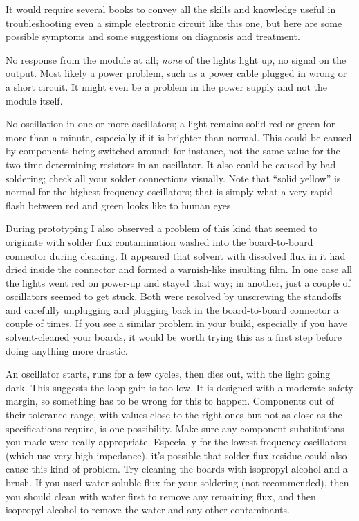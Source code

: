 It would require several books to convey all the skills and knowledge useful
in troubleshooting even a simple electronic circuit like this one, but here
are some possible symptoms and some suggestions on diagnosis and treatment.

No response from the module at all; \emph{none} of the lights light up, no
signal on the output.  Most likely a power problem, such as a power cable
plugged in wrong or a short circuit.  It might even be a problem in the
power supply and not the module itself.

No oscillation in one or more oscillators; a light remains solid red or
green for more than a minute, especially if it is brighter than normal.
This could be caused by components being switched around; for instance, not
the same value for the two time-determining resistors in an oscillator.  It
also could be caused by bad soldering; check all your solder connections
visually.  Note that ``solid yellow'' is normal for the
highest-frequency oscillators; that is simply what a very rapid flash between
red and green looks like to human eyes.

During prototyping I also observed a problem of this kind that seemed to
originate with solder flux contamination washed into the board-to-board
connector during cleaning.  It appeared that solvent with dissolved flux in
it had dried inside the connector and formed a varnish-like insulting film. 
In one case all the lights went red on power-up and stayed that way; in
another, just a couple of oscillators seemed to get stuck.  Both were
resolved by unscrewing the standoffs and carefully unplugging and plugging
back in the board-to-board connector a couple of times.  If you see a
similar problem in your build, especially if you have solvent-cleaned your
boards, it would be worth trying this as a first step before doing anything
more drastic.

An oscillator starts, runs for a few cycles, then dies out, with the light
going dark.  This suggests the loop gain is too low.  It is designed with a
moderate safety margin, so something has to be wrong for this to happen. 
Components out of their tolerance range, with values close to the right ones
but not as close as the specifications require, is one possibility.  Make
sure any component substitutions you made were really appropriate. 
Especially for the lowest-frequency oscillators (which use very high
impedance), it's possible that solder-flux residue could also cause this
kind of problem.  Try cleaning the boards with isopropyl alcohol and a
brush.  If you used water-soluble flux for your soldering (not recommended),
then you should clean with water first to remove any remaining flux, and
then isopropyl alcohol to remove the water and any other contaminants.

